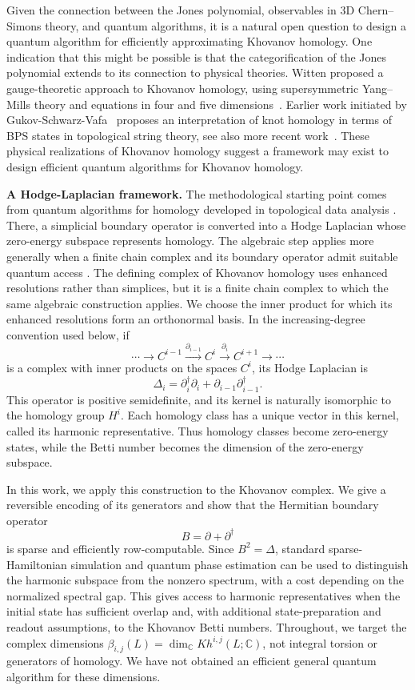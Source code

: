 \documentclass[a4paper,onecolumn,unpublished]{quantumarticle}
\theoremstyle{plain}
\theoremstyle{definition}
\theoremstyle{definition}
\numberwithin{equation}{section}
\begin{document}
Given the connection between the Jones polynomial, observables in 3D Chern--Simons theory, and quantum algorithms, it is a natural open question to design a quantum algorithm for efficiently approximating Khovanov homology.    One indication that this might be possible is that the categorification of the Jones polynomial extends to its connection to physical theories.  Witten proposed a gauge-theoretic approach to Khovanov homology, using supersymmetric Yang--Mills theory and equations in four and five dimensions~\cite{Witten-fivebrane,witten2012khovanov,Gaiotto-Witten}. Earlier work initiated by Gukov-Schwarz-Vafa~\cite{Gukov_2005,Aganagic} proposes an interpretation of knot homology in terms of BPS states in topological string theory, see also more recent work~\cite{GPPV,Aganagic_2024}.  These physical realizations of Khovanov homology suggest a framework may exist to design efficient quantum algorithms for Khovanov homology.  
\smallskip 

\noindent \textbf{A Hodge-Laplacian framework.}
The methodological starting point comes from quantum algorithms for homology developed in topological data analysis \cite{lloyd2016quantum,GoogleBettiBerry}.  There, a simplicial boundary operator is converted into a Hodge Laplacian whose zero-energy subspace represents homology.  The algebraic step applies more generally when a finite chain complex and its boundary operator admit suitable quantum access \cite{cade2021complexity}.  The defining complex of Khovanov homology uses enhanced resolutions rather than simplices, but it is a finite chain complex to which the same algebraic construction applies.  We choose the inner product for which its enhanced resolutions form an orthonormal basis.  In the increasing-degree convention used below, if
\[
\cdots \longrightarrow C^{i-1}
\xrightarrow{\partial_{i-1}} C^i
\xrightarrow{\partial_i} C^{i+1}
\longrightarrow \cdots
\]
is a complex with inner products on the spaces $C^i$, its Hodge Laplacian is
\[
\Delta_i=\partial_i^\dagger\partial_i+\partial_{i-1}\partial_{i-1}^\dagger.
\]
This operator is positive semidefinite, and its kernel is naturally isomorphic to the homology group $H^i$.  Each homology class has a unique vector in this kernel, called its harmonic representative.  Thus homology classes become zero-energy states, while the Betti number becomes the dimension of the zero-energy subspace.

In this work, we apply this construction to the Khovanov complex.  We give a reversible encoding of its generators and show that the Hermitian boundary operator
\[
B=\partial+\partial^\dagger
\]
is sparse and efficiently row-computable.  Since $B^2=\Delta$, standard sparse-Hamiltonian simulation and quantum phase estimation can be used to distinguish the harmonic subspace from the nonzero spectrum, with a cost depending on the normalized spectral gap. This gives access to harmonic representatives when the initial state has sufficient overlap and, with additional state-preparation and readout assumptions, to the Khovanov Betti numbers. Throughout, we target the complex dimensions $\beta_{i,j}(L)=\dim_{\mathbb C}Kh^{i,j}(L;\mathbb C)$, not integral torsion or generators of homology. 
We have not obtained an efficient general quantum algorithm for these dimensions.
\smallskip 
\end{document}
